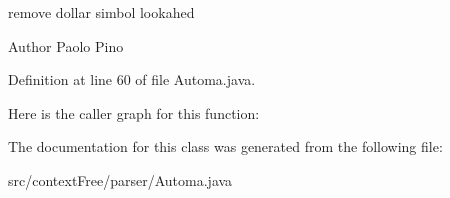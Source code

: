 remove dollar simbol lookahed 

\begin{DoxyAuthor}{Author}
Paolo Pino 
\end{DoxyAuthor}


Definition at line 60 of file Automa.\-java.



Here is the caller graph for this function\-:




The documentation for this class was generated from the following file\-:\begin{DoxyCompactItemize}
\item 
src/context\-Free/parser/Automa.\-java\end{DoxyCompactItemize}
